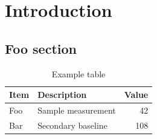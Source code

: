 \chapter{Introduction}
\label{chap:intro}

\lipsum[1-3]


\section{Foo section}

\lipsum[4-6]

\begin{table}[htbp]
\centering
\begin{tabular}{llr}
\toprule
Item & Description & Value \\
\midrule
Foo  & Sample measurement & 42 \\
Bar  & Secondary baseline  & 108 \\
\bottomrule
\end{tabular}
\caption{Example table}
\label{eg-table}
\end{table}

\lipsum[7-8]
